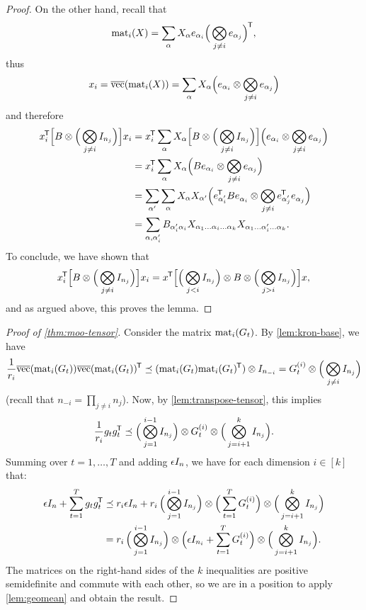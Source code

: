 \begin{proof}
On the other hand, recall that
$$
\mathrm{mat}_{i}(X)
=
\sum_\alpha X_\alpha e_{\alpha_i} \mathopen{}\Big(\bigotimes_{j \ne i} e_{\alpha_j}\Big)^{\mkern-1.5mu\scriptstyle\mathsf{T}}
,
$$
thus
$$
x_i
=
\overline{\mathrm{vec}}(\mathrm{mat}_{i}(X))
=
\sum_\alpha X_\alpha \mathopen{}\Big(e_{\alpha_i} \otimes \bigotimes_{j \ne i} e_{\alpha_j}\Big)
$$
and therefore
\begin{align*}
x_i^{\mkern-1.5mu\scriptstyle\mathsf{T}} \mathopen{}\Big[ B \otimes \mathopen{}\Big( \bigotimes_{j\neq i} I_{n_j} \Big) \Big] x_i
&=
x_i^{\mkern-1.5mu\scriptstyle\mathsf{T}} \sum_\alpha X_\alpha \mathopen{}\Big[ B \otimes \mathopen{}\Big( \bigotimes_{j\neq i} I_{n_j} \Big) \Big] \mathopen{}\Big(e_{\alpha_i} \otimes \bigotimes_{j \ne i} e_{\alpha_j}\Big)
\\
&=
x_i^{\mkern-1.5mu\scriptstyle\mathsf{T}} \sum_\alpha X_\alpha \mathopen{}\Big( Be_{\alpha_i} \otimes \bigotimes_{j \ne i} e_{\alpha_j} \Big)
\\
&=
\sum_{\alpha'} \sum_\alpha X_\alpha X_{\alpha'}
\mathopen{}\Big( e_{\smash{\alpha'_i}}^{\mkern-1.5mu\scriptstyle\mathsf{T}} B e^{}_{\alpha_i} \otimes \bigotimes_{j \ne i} e_{\smash{\alpha'_j}}^{\mkern-1.5mu\scriptstyle\mathsf{T}} e^{}_{\alpha_j} \Big)
\\
&=
\sum_{\alpha, \alpha'_i} B_{\alpha'_i\alpha_i} X_{\alpha_1\ldots \alpha_i\ldots \alpha_k}  X_{\alpha_1\ldots \alpha'_i\ldots \alpha_k}
.
\end{align*}
%
To conclude, we have shown that
\begin{align*}
x_i^{\mkern-1.5mu\scriptstyle\mathsf{T}} \mathopen{}\Big[ B \otimes \mathopen{}\Big( \bigotimes_{j\neq i} I_{n_j} \Big) \Big] x_i
=
x^{\mkern-1.5mu\scriptstyle\mathsf{T}} \mathopen{}\Big[\mathopen{}\Big( \bigotimes_{j<i} I_{n_j} \Big) \otimes B \otimes \mathopen{}\Big( \bigotimes_{j>i} I_{n_j} \Big)\Big] x
,
\end{align*}
and as argued above, this proves the lemma.
\end{proof}

\begin{proof}[Proof of \cref{thm:moo-tensor}]
Consider the matrix $\mathrm{mat}_{i}(G_t)$.  By \cref{lem:kron-base}, we have
\begin{align*}
\frac{1}{r_i} \overline{\mathrm{vec}}(\mathrm{mat}_{i}(G_t))\overline{\mathrm{vec}}(\mathrm{mat}_{i}(G_t))^{\mkern-1.5mu\scriptstyle\mathsf{T}}
\preceq
(\mathrm{mat}_{i}(G_t)\mathrm{mat}_{i}(G_t)^{\mkern-1.5mu\scriptstyle\mathsf{T}}) \otimes I_{n_{-i}}
=
G_t^{(i)} \otimes \mathopen{}\Big( \bigotimes_{j \ne i} I_{n_j} \Big)
\end{align*}
(recall that $n_{-i} = \prod_{j\neq i} n_j$). 
Now, by \cref{lem:transpose-tensor}, this implies
\begin{align*}
\frac{1}{r_i} g_tg_t^{\mkern-1.5mu\scriptstyle\mathsf{T}}
\preceq
\mathopen{}\Big(\bigotimes_{j=1}^{i-1} I_{n_j}\Big) \otimes G_t^{(i)} \otimes \mathopen{}\Big(\bigotimes_{j=i+1}^{k} I_{n_j}\Big)
.
\end{align*}
Summing over $t=1,\ldots,T$ and adding $\epsilon I_n$, we have for each dimension $i \in [k]$ that:
\begin{align*}
\epsilon I_{n} + \sum_{t=1}^T g_t g_t^{\mkern-1.5mu\scriptstyle\mathsf{T}}
&\preceq
r_i \epsilon I_{n} + r_i \, \mathopen{}\Big(\bigotimes_{j=1}^{i-1} I_{n_j}\Big) \otimes \mathopen{}\Big(\sum_{t=1}^T G_t^{(i)}\Big) \otimes \mathopen{}\Big(\bigotimes_{j=i+1}^{k} I_{n_j}\Big)
\\
&=
r_i \, \mathopen{}\Big(\bigotimes_{j=1}^{i-1} I_{n_j}\Big) \otimes \mathopen{}\Big( \epsilon I_{n_i} + \sum_{t=1}^T G_t^{(i)} \Big) \otimes \mathopen{}\Big(\bigotimes_{j=i+1}^{k} I_{n_j}\Big)
.
\end{align*}
%
The matrices on the right-hand sides of the $k$ inequalities are positive semidefinite and commute with each other, so we are in
a position to apply \cref{lem:geomean} and obtain the result.
\end{proof}


